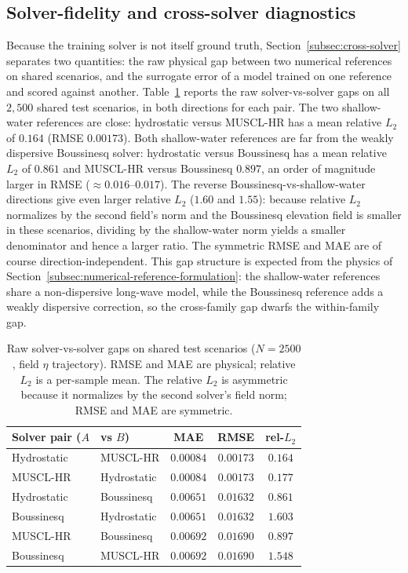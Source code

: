 \subsection{Solver-fidelity and cross-solver diagnostics}
\label{subsec:res-solver-fidelity}

Because the training solver is not itself ground truth, Section~\ref{subsec:cross-solver} separates two quantities: the raw physical gap between two numerical references on shared scenarios, and the surrogate error of a model trained on one reference and scored against another. Table~\ref{tab:solvergap} reports the raw solver-vs-solver gaps on all $2{,}500$ shared test scenarios, in both directions for each pair. The two shallow-water references are close: hydrostatic versus MUSCL-HR has a mean relative $L_2$ of $0.164$ (RMSE $0.00173$). Both shallow-water references are far from the weakly dispersive Boussinesq solver: hydrostatic versus Boussinesq has a mean relative $L_2$ of $0.861$ and MUSCL-HR versus Boussinesq $0.897$, an order of magnitude larger in RMSE ($\approx 0.016$--$0.017$). The reverse Boussinesq-vs-shallow-water directions give even larger relative $L_2$ ($1.60$ and $1.55$): because relative $L_2$ normalizes by the second field's norm and the Boussinesq elevation field is smaller in these scenarios, dividing by the shallow-water norm yields a smaller denominator and hence a larger ratio. The symmetric RMSE and MAE are of course direction-independent. This gap structure is expected from the physics of Section~\ref{subsec:numerical-reference-formulation}: the shallow-water references share a non-dispersive long-wave model, while the Boussinesq reference adds a weakly dispersive correction, so the cross-family gap dwarfs the within-family gap.

\begin{table}[!htbp]
\centering
\caption{Raw solver-vs-solver gaps on shared test scenarios ($N = 2500$, field $\eta$ trajectory). RMSE and MAE are physical; relative $L_2$ is a per-sample mean. The relative $L_2$ is asymmetric because it normalizes by the second solver's field norm; RMSE and MAE are symmetric.}
\label{tab:solvergap}
\begin{tabular}{llccc}
    \toprule
    Solver pair ($A$ & vs $B$) & MAE & RMSE & rel-$L_2$ \\
    \midrule
    Hydrostatic & MUSCL-HR    & $0.00084$ & $0.00173$ & $0.164$ \\
    MUSCL-HR    & Hydrostatic & $0.00084$ & $0.00173$ & $0.177$ \\
    Hydrostatic & Boussinesq  & $0.00651$ & $0.01632$ & $0.861$ \\
    Boussinesq  & Hydrostatic & $0.00651$ & $0.01632$ & $1.603$ \\
    MUSCL-HR    & Boussinesq  & $0.00692$ & $0.01690$ & $0.897$ \\
    Boussinesq  & MUSCL-HR    & $0.00692$ & $0.01690$ & $1.548$ \\
    \bottomrule
\end{tabular}
\end{table}

